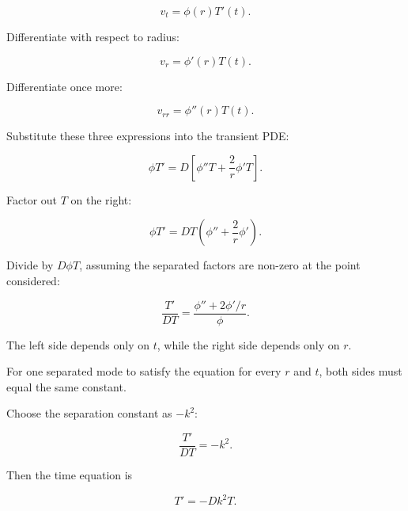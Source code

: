 \documentclass[11pt,a4paper]{article}
\begin{document}
\begin{equation}
v_t=\phi(r)T'(t).
\tag{TRISO-ANA-230}
\label{eq:triso-ana-230}
\end{equation}

Differentiate with respect to radius:

\begin{equation}
v_r=\phi'(r)T(t).
\tag{TRISO-ANA-231}
\label{eq:triso-ana-231}
\end{equation}

Differentiate once more:

\begin{equation}
v_{rr}=\phi''(r)T(t).
\tag{TRISO-ANA-232}
\label{eq:triso-ana-232}
\end{equation}

Substitute these three expressions into the transient PDE:

\begin{equation}
\phi T'
=
D
\left[
\phi''T
+
\frac2r\phi'T
\right].
\tag{TRISO-ANA-233}
\label{eq:triso-ana-233}
\end{equation}

Factor out $T$ on the right:

\begin{equation}
\phi T'
=
DT
\left(
\phi''+\frac2r\phi'
\right).
\tag{TRISO-ANA-234}
\label{eq:triso-ana-234}
\end{equation}

Divide by $D\phi T$, assuming the separated factors are non-zero at the point considered:

\begin{equation}
\frac{T'}{DT}
=
\frac{\phi''+2\phi'/r}{\phi}.
\tag{TRISO-ANA-235}
\label{eq:triso-ana-235}
\end{equation}

The left side depends only on $t$, while the right side depends only on $r$.

For one separated mode to satisfy the equation for every $r$ and $t$, both sides must equal the same constant.

Choose the separation constant as $-k^2$:

\begin{equation}
\frac{T'}{DT}=-k^2.
\tag{TRISO-ANA-236}
\label{eq:triso-ana-236}
\end{equation}

Then the time equation is

\begin{equation}
T'=-Dk^2T.
\tag{TRISO-ANA-237}
\label{eq:triso-ana-237}
\end{equation}
\end{document}
